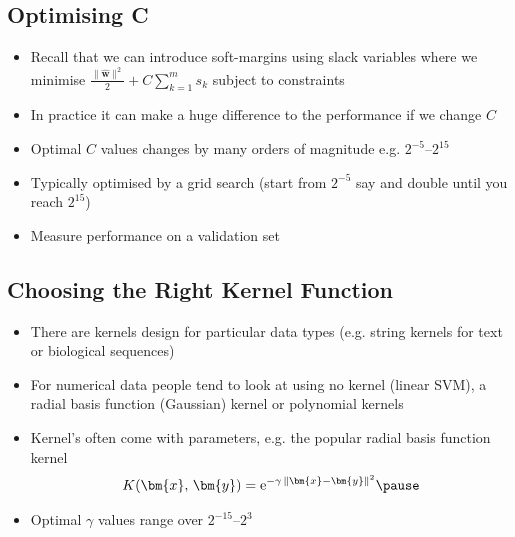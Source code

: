 
\begin{slide}
\section[-2]{Optimising C}

\begin{PauseHighLight}
  \begin{itemize}
  \item Recall that we can introduce soft-margins using slack
    variables where we minimise
    $\frac{\|\hat{\bm{w}}\|^2}{2} + C \sum_{k=1}^m s_k$ subject to
    constraints\pause
  \item In practice it can make a huge difference to the performance if
    we change $C$\pause
  \item Optimal $C$ values changes by many orders of magnitude
    e.g. $2^{-5}$--$2^{15}$\pause
  \item Typically optimised by a grid search (start from $2^{-5}$ say and
    double until you reach $2^{15}$)\pause
  \item Measure performance on a validation set\pause
  \end{itemize}
\end{PauseHighLight}

\end{slide}


\begin{slide}
\section{Choosing the Right Kernel Function}

\begin{PauseHighLight}
  \begin{itemize}
  \item There are kernels design for particular data types (e.g. string
    kernels for text or biological sequences)\pause
  \item For numerical data people tend to look at using no kernel
    (linear SVM), a radial basis function (Gaussian) kernel or
    polynomial kernels\pause
  \item Kernel's often come with parameters, e.g. the popular radial
    basis function kernel
    \begin{align*}
       K(\bm{x},\,\bm{y}) =
      \mathrm{e}^{-\gamma\,\|\bm{x}-\bm{y}\|^2}\pause
    \end{align*}
  \item Optimal $\gamma$ values range over $2^{-15}$--$2^3$\pause
  \end{itemize}
\end{PauseHighLight}

\end{slide}

